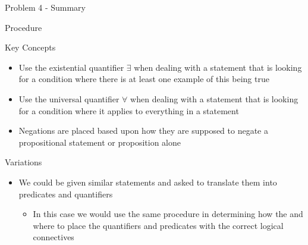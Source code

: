 \begin{summary}{Problem 4 - Summary}
\begin{statement}{Procedure}
\begin{enumerate}[label = (\alph*)]
\begin{itemize}
            \end{itemize}
        \end{enumerate}
    \end{statement}
    \begin{statement}{Key Concepts}
        \begin{itemize}
            \item Use the existential quantifier $\exists$ when dealing with a statement that is looking for a condition where there is at least one example of this being true
            \item Use the universal quantifier $\forall$ when dealing with a statement that is looking for a condition where it applies to everything in a statement
            \item Negations are placed based upon how they are supposed to negate a propositional statement or proposition alone
        \end{itemize}
    \end{statement}
    \begin{statement}{Variations}
        \begin{itemize}
            \item We could be given similar statements and asked to translate them into predicates and quantifiers
            \begin{itemize}
                \item In this case we would use the same procedure in determining how the and where to place the quantifiers and predicates with the correct logical connectives
            \end{itemize}
        \end{itemize}
    \end{statement}
\end{summary}

